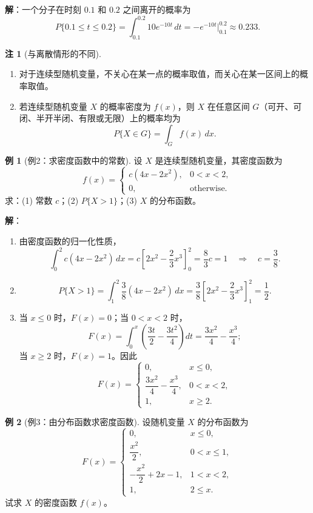 \documentclass[11pt,a4paper]{report}
\theoremstyle{definition}
\newtheorem{example}{例}[chapter]
\newtheorem{note}{注}[chapter]
\begin{document}
\textbf{解}：一个分子在时刻 $0.1$ 和 $0.2$ 之间离开的概率为
\[
P\{0.1 \leq t \leq 0.2\} = \int_{0.1}^{0.2} 10e^{-10t}\,dt = -e^{-10t}\Big|_{0.1}^{0.2} \approx 0.233.
\]

\begin{note}[与离散情形的不同]
\begin{enumerate}[leftmargin=2em]
    \item 对于连续型随机变量，不关心在某一点的概率取值，而关心在某一区间上的概率取值。
    \item 若连续型随机变量 $X$ 的概率密度为 $f(x)$，则 $X$ 在任意区间 $G$（可开、可闭、半开半闭、有限或无限）上的概率均为
    \[
    P\{X \in G\} = \int_G f(x)\,dx.
    \]
\end{enumerate}
\end{note}

\begin{example}[例2：求密度函数中的常数]
设 $X$ 是连续型随机变量，其密度函数为
\[
f(x) = \begin{cases} c(4x-2x^2), & 0 < x < 2, \\ 0, & \text{otherwise}. \end{cases}
\]
求：(1) 常数 $c$；(2) $P\{X > 1\}$；(3) $X$ 的分布函数。
\end{example}

\textbf{解}：
\begin{enumerate}[label=(\arabic*),leftmargin=2em]
    \item 由密度函数的归一化性质，
    \[
    \int_0^2 c(4x-2x^2)\,dx = c\left[2x^2-\frac{2}{3}x^3\right]_0^2 = \frac{8}{3}c = 1 \quad\Longrightarrow\quad \boxed{c=\frac{3}{8}}.
    \]
    
    \item
    \[
    P\{X > 1\} = \int_1^2 \frac{3}{8}(4x-2x^2)\,dx = \frac{3}{8}\left[2x^2-\frac{2}{3}x^3\right]_1^2 = \boxed{\frac{1}{2}}.
    \]
    
    \item 当 $x \leq 0$ 时，$F(x)=0$；当 $0 < x < 2$ 时，
    \[
    F(x) = \int_0^x \left(\frac{3t}{2}-\frac{3t^2}{4}\right)dt = \frac{3x^2}{4}-\frac{x^3}{4};
    \]
    当 $x \geq 2$ 时，$F(x)=1$。因此
    \[
    F(x) = \begin{cases}
    0, & x \leq 0, \\[0.3em]
    \dfrac{3x^2}{4}-\dfrac{x^3}{4}, & 0 < x < 2, \\[0.5em]
    1, & x \geq 2.
    \end{cases}
    \]
\end{enumerate}

\begin{example}[例3：由分布函数求密度函数]
设随机变量 $X$ 的分布函数为
\[
F(x) = \begin{cases}
0, & x \leq 0, \\[0.3em]
\dfrac{x^2}{2}, & 0 < x \leq 1, \\[0.5em]
-\dfrac{x^2}{2}+2x-1, & 1 < x < 2, \\[0.5em]
1, & 2 \leq x.
\end{cases}
\]
试求 $X$ 的密度函数 $f(x)$。
\end{example}
\end{document}
